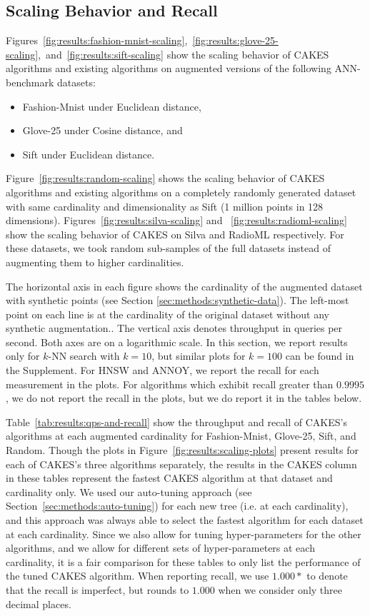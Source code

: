 \subsection{Scaling Behavior and Recall}
\label{sec:results:scaling-behavior-and-recall}

Figures~\ref{fig:results:fashion-mnist-scaling},~\ref{fig:results:glove-25-scaling},~and~\ref{fig:results:sift-scaling} show the scaling behavior of CAKES algorithms and existing algorithms on augmented versions of the following ANN-benchmark datasets:

\begin{itemize}
    \item Fashion-Mnist under Euclidean distance,
    \item Glove-25 under Cosine distance, and
    \item Sift under Euclidean distance.
\end{itemize}

Figure~\ref{fig:results:random-scaling} shows the scaling behavior of CAKES algorithms and existing algorithms on a completely randomly generated dataset with same cardinality and dimensionality as Sift (1 million points in 128 dimensions).
Figures~\ref{fig:results:silva-scaling} and ~\ref{fig:results:radioml-scaling} show the scaling behavior of CAKES on Silva and RadioML respectively.
For these datasets, we took random sub-samples of the full datasets instead of augmenting them to higher cardinalities.

The horizontal axis in each figure shows the cardinality of the augmented dataset with synthetic points (see Section \ref{sec:methods:synthetic-data}).
The left-most point on each line is at the cardinality of the original dataset without any synthetic augmentation..
The vertical axis denotes throughput in queries per second.
Both axes are on a logarithmic scale.
In this section, we report results only for $k$-NN search with $k = 10$, but similar plots for $k = 100$ can be found in the Supplement.
For HNSW and ANNOY, we report the recall for each measurement in the plots. For algorithms which exhibit recall greater than $0.9995$, we do not report the recall in the plots, but we do report it in the tables below.

Table~\ref{tab:results:qps-and-recall} show the throughput and recall of CAKES's algorithms at each augmented cardinality for Fashion-Mnist, Glove-25, Sift, and Random. 
Though the plots in Figure~\ref{fig:results:scaling-plots} present results for each of CAKES's three algorithms separately, the results in the CAKES column in these tables represent the fastest CAKES algorithm at that dataset and cardinality only.
We used our auto-tuning approach (see Section~\ref{sec:methods:auto-tuning}) for each new tree (i.e. at each cardinality), and this approach was always able to select the fastest algorithm for each dataset at each cardinality.
Since we also allow for tuning hyper-parameters for the other algorithms, and we allow for different sets of hyper-parameters at each cardinality, it is a fair comparison for these tables to only list the performance of the tuned CAKES algorithm.
When reporting recall, we use $1.000*$ to denote that the recall is imperfect, but rounds to $1.000$ when we consider only three decimal places.


